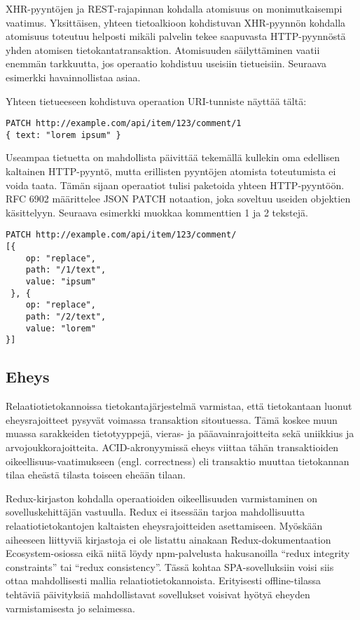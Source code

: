 \documentclass[finnish,twoside,censored,csm,sw-track-2018]{HYthesisML}
\begin{document}
XHR-pyyntöjen ja REST-rajapinnan kohdalla atomisuus on monimutkaisempi vaatimus. Yksittäisen, yhteen tietoalkioon kohdistuvan XHR-pyynnön kohdalla atomisuus toteutuu helposti mikäli palvelin tekee saapuvasta HTTP-pyynnöstä yhden atomisen tietokantatransaktion. Atomisuuden säilyttäminen vaatii enemmän tarkkuutta, jos operaatio kohdistuu useisiin tietueisiin. Seuraava esimerkki havainnollistaa asiaa.

Yhteen tietueeseen kohdistuva operaation URI-tunniste näyttää tältä:

\begin{Verbatim}[fontsize=\small]
PATCH http://example.com/api/item/123/comment/1
{ text: "lorem ipsum" }
\end{Verbatim}

Useampaa tietuetta on mahdollista päivittää tekemällä kullekin oma edellisen kaltainen HTTP-pyyntö, mutta erillisten pyyntöjen atomista toteutumista ei voida taata. Tämän sijaan operaatiot tulisi paketoida yhteen HTTP-pyyntöön. RFC 6902 \citep{rfc6902} määrittelee JSON PATCH notaation, joka soveltuu useiden objektien käsittelyyn. Seuraava esimerkki muokkaa kommenttien 1 ja 2 tekstejä.

\begin{Verbatim}[fontsize=\small]
PATCH http://example.com/api/item/123/comment/
[{ 
    op: "replace",
    path: "/1/text",
    value: "ipsum"
 }, {
    op: "replace",
    path: "/2/text",
    value: "lorem"
}]
\end{Verbatim}

\subsection{Eheys}

Relaatiotietokannoissa tietokantajärjestelmä varmistaa, että tietokantaan luonut eheysrajoitteet pysyvät voimassa transaktion sitoutuessa. Tämä koskee muun muassa sarakkeiden tietotyyppejä, vieras- ja pääavainrajoitteita sekä uniikkius ja arvojoukkorajoitteita. ACID-akronyymissä eheys viittaa tähän transaktioiden oikeellisuus-vaatimukseen (engl. correctness) eli transaktio muuttaa tietokannan tilaa eheästä tilasta toiseen eheään tilaan.

Redux-kirjaston kohdalla operaatioiden oikeellisuuden varmistaminen on sovelluskehittäjän vastuulla. Redux ei itsessään tarjoa mahdollisuutta relaatiotietokantojen kaltaisten eheysrajoitteiden asettamiseen. Myöskään aiheeseen liittyviä kirjastoja ei ole listattu ainakaan Redux-dokumentaation Ecosystem-osiossa eikä niitä löydy npm-palvelusta hakusanoilla ``redux integrity constraints'' tai ``redux consistency''. Tässä kohtaa SPA-sovelluksiin voisi siis ottaa mahdollisesti mallia relaatiotietokannoista. Erityisesti offline-tilassa tehtäviä päivityksiä mahdollistavat sovellukset voisivat hyötyä eheyden varmistamisesta jo selaimessa.
\end{document}

